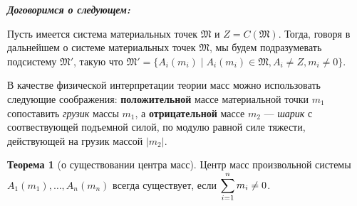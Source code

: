 \documentclass[14pt]{extarticle}
\theoremstyle{definition}
\theoremstyle{theorem}
\newtheorem*{theorem}{Теорема}
\begin{document}
\begin{framed}
\noindent\textbf{\textit{Договоримся о следующем:}}

Пусть имеется система материальных точек  
\(\mathfrak{M}\) и 
\(Z = C(\mathfrak{M})\).
Тогда, говоря в дальнейшем о системе материальных точек
\(\mathfrak{M}\), %
мы будем подразумевать подсистему \(\mathfrak{M'}\), такую что 
\(\mathfrak{M'} = \big\{ A_i(m_i) \mid A_i(m_i) \in \mathfrak{M}, A_i \neq Z,
m_i \neq 0 \big\}\). 
%
\end{framed} 



В качестве физической интерпретации теории масс можно использовать
следующие соображения: \textbf{положительной} массе материальной точки \(m_1\)
сопоставить \textit{грузик} массы \(m_1\), а \textbf{отрицательной} массе 
\(m_2\) --- \textit{шарик} с соотвествующей подъемной силой,
по модулю равной силе тяжести, действующей на грузик массой \(|m_2|\).\\



\begin{theorem}[о существовании центра масс]
	Центр масс произвольной системы $A_1(m_1), \dots , A_n(m_n)$
	всегда существует, если $\mathlarger{\sum_{i=1}^{n} m_i \ne 0}$.
\end{theorem}
\end{document}
